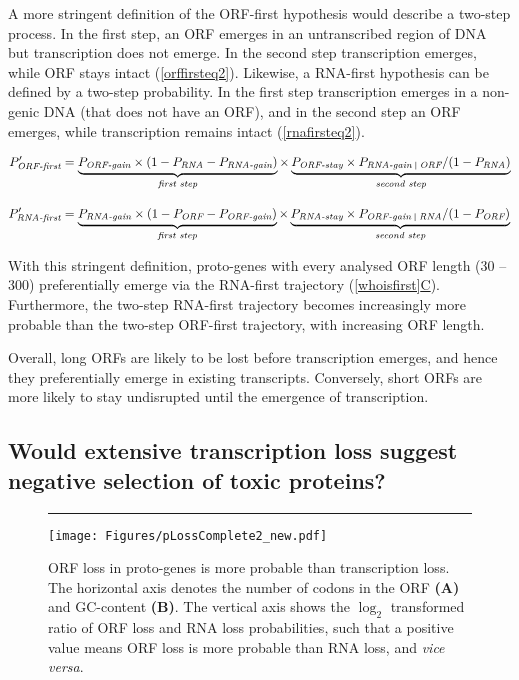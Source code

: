 \documentclass[12pt,a4paper]{article}
\begin{document}
A more stringent definition of the ORF-first hypothesis would describe a two-step process. In the first step, an ORF emerges in an untranscribed region of DNA but transcription does not emerge. In the second step transcription emerges, while ORF stays intact (\autoref{orffirsteq2}). Likewise, a RNA-first hypothesis can be defined by a two-step probability. In the first step transcription emerges in a non-genic DNA (that does not have an ORF), and in the second step an ORF emerges, while transcription remains intact (\autoref{rnafirsteq2}).

\begin{align}
P_\textit{ORF-first}' & = \underbrace{P_\textit{ORF-gain} \times (1-P_\textit{RNA} -P_\textit{RNA-gain})}_\textit{first step} \times \underbrace{P_\textit{ORF-stay}\times P_\textit{RNA-gain \vline\ ORF}/(1-P_\textit{RNA})}_\textit{second step} \label{orffirsteq2}\\[1em]
P_\textit{RNA-first}' & = \underbrace{P_\textit{RNA-gain} \times (1-P_\textit{ORF} -P_\textit{ORF-gain})}_\textit{first step} \times \underbrace{P_\textit{RNA-stay}\times P_\textit{ORF-gain \vline\ RNA}/(1-P_\textit{ORF})}_\textit{second step}\label{rnafirsteq2}
\end{align}

With this stringent definition, proto-genes with every analysed ORF length (30 -- 300) preferentially emerge via the RNA-first trajectory (\hyperref[whoisfirst]{\autoref{whoisfirst}C}). Furthermore, the two-step RNA-first trajectory becomes increasingly more probable than the two-step ORF-first trajectory, with increasing ORF length.

Overall, long ORFs are likely to be lost before transcription emerges, and hence they preferentially emerge in existing transcripts. Conversely, short ORFs are more likely to stay undisrupted until the emergence of transcription.

\subsection{Would extensive transcription loss suggest negative selection of toxic proteins?}


\begin{figure}[!b]
\centering
\hrule
\vspace{1ex}
\texttt{[image: Figures/pLossComplete2\_new.pdf]}
\caption{ORF loss in proto-genes is more probable than transcription loss. The horizontal axis denotes the number of codons in the ORF \textbf{(A)} and GC-content \textbf{(B)}. The vertical axis shows the $\log_2$ transformed ratio of ORF loss and RNA loss probabilities, such that a positive value means ORF loss is more probable than RNA loss, and \textit{vice versa}.}
\label{lossprob}
\end{figure}
\end{document}
